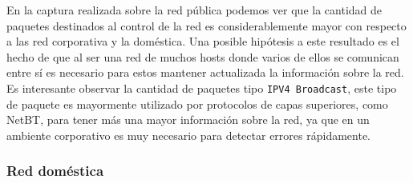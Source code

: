 En la captura realizada sobre la red pública podemos ver que la cantidad de paquetes destinados al control de la red es considerablemente mayor con respecto a las red corporativa y la doméstica. Una posible hipótesis a este resultado es el hecho de que al ser una red de muchos hosts donde varios de ellos se comunican entre sí es necesario para estos mantener actualizada la información sobre la red. Es interesante observar la cantidad de paquetes tipo \texttt{IPV4 Broadcast}, este tipo de paquete es mayormente utilizado por protocolos de capas superiores, como NetBT, para tener más una mayor información sobre la red, ya que en un ambiente corporativo es muy necesario para detectar errores rápidamente.

\subsubsection{Red doméstica}

